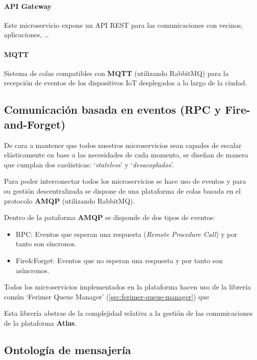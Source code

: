 \paragraph{API Gateway}

Este microservicio expone un API REST para las comunicaciones con vecinos, aplicaciones, \ldots

\paragraph{MQTT}

Sistema de colas compatibles con \textbf{MQTT} (utilizando RabbitMQ) para la recepción de eventos de los dispositivos IoT desplegados a lo largo de la ciudad.

\subsection{Comunicación basada en eventos (RPC y Fire-and-Forget)}

De cara a mantener que todos nuestros microservicios sean capades de escalar elásticamente en base a las necesidades de cada momento, se diseñan de manera que cumplan dos casúisticas: `\textit{stateless}' y `\textit{desacoplados}'.

Para poder interconectar todos los microservicios se hace uso de eventos y para su gestión descentralizada se dispone de una plataforma de colas basada en el protocolo \textbf{AMQP} (utilizando RabbitMQ).

Dentro de la pataforma \textbf{AMQP} se disponde de dos tipos de eventos:

\begin{itemize}
	\item RPC: Eventos que esperan una respuesta (\textit{Remote Procedure Call}) y por tanto son síncronos.
	\item Fire\&Forget: Eventos que no esperan una respuesta y por tanto son asíncronos.
\end{itemize}

Todos los microservicios implementados en la plataforma hacen uso de la librería común `Ferimer Queue Manager' (\ref{sec:ferimer-queue-manager}) que 

Esta librería abstrae de la complejidad relativa a la gestión de las comunicaciones de la plataforma \textbf{Atlas}.

\subsection{Ontología de mensajería}


